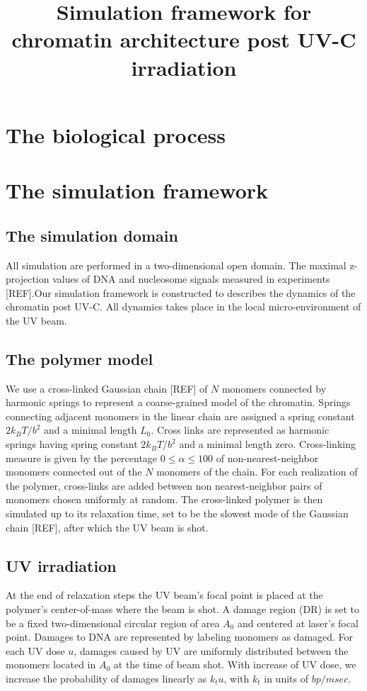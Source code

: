 \documentclass[12pt]{report}
\begin{document}
	
	\title{Simulation framework for chromatin architecture post UV-C irradiation}
	\section{The biological process}
	
	\section{The simulation framework}
	
	\subsection{The simulation domain}
	All simulation are performed in a two-dimensional open domain. The maximal z-projection values of DNA and nucleosome signals measured in experiments [REF].Our simulation framework is constructed to describes the dynamics of the chromatin post UV-C. All dynamics takes place in the local micro-environment of the UV beam. 
	
	\subsection{The polymer model}
	We use a cross-linked Gaussian chain [REF] of $N$ monomers connected by harmonic springs to represent a coarse-grained model of the chromatin. Springs connecting adjacent monomers in the linear chain are assigned a spring constant $2k_BT/b^2$ and a minimal length $L_0$.  Cross links are represented as harmonic springs having spring constant $2k_BT/b^2$ and a minimal length zero. Cross-linking measure is given by the percentage $0\leq \alpha\leq 100$ of non-nearest-neighbor monomers connected out of the $N$ monomers of the chain. For each realization of the polymer, cross-links are added between non nearest-neighbor pairs of monomers chosen uniformly at random. The cross-linked polymer is then simulated up to its relaxation time, set to be the slowest mode of the Gaussian chain [REF], after which the UV beam is shot.
	
	\subsection{UV irradiation}
	At the end of relaxation steps the UV beam's focal point is placed at the polymer's center-of-mass where the beam is shot. A damage region (DR) is set to be a fixed two-dimensional circular region of area $A_0$ and centered at laser's focal point. Damages to DNA are represented by labeling monomers as damaged. For each UV dose $u$, damages caused by UV are uniformly distributed  between the monomers located in $A_0$ at the time of beam shot. With increase of UV dose, we increase the probability of damages linearly as $k_tu$, with $k_t$ in units of $bp/msec$. 
	
\end{document}
